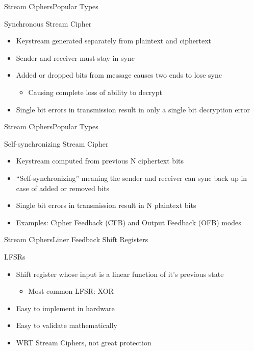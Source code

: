 \documentclass[12pt]{beamer}
\begin{document}
\begin{frame}{Stream Ciphers}{Popular Types}
\begin{block}{Synchronous Stream Cipher}
\begin{itemize}
	\item Keystream generated separately from plaintext and ciphertext
	\item Sender and receiver must stay in sync
	\item Added or dropped bits from message causes two ends to lose sync
	\begin{itemize}
		\item Causing complete loss of ability to decrypt
	\end{itemize}
	\item Single bit errors in transmission result in only a single bit decryption error
\end{itemize}
\end{block}
\end{frame}

\begin{frame}{Stream Ciphers}{Popular Types}
\begin{block}{Self-synchronizing Stream Cipher}
\begin{itemize}
	\item Keystream computed from previous N ciphertext bits
	\item ``Self-synchronizing'' meaning the sender and receiver can sync back up in case of added or removed bits
	\item Single bit errors in transmission result in N plaintext bits
	\item Examples: Cipher Feedback (CFB) and Output Feedback (OFB) modes
\end{itemize}
\end{block}
\end{frame}

\begin{frame}{Stream Ciphers}{Liner Feedback Shift Registers}
\begin{block}{LFSRs}
\begin{itemize}
	\item Shift register whose input is a linear function of it's previous state
	\begin{itemize}
		\item Most common LFSR: XOR
	\end{itemize}
	\item Easy to implement in hardware
	\item Easy to validate mathematically
	\item WRT Stream Ciphers, not great protection
\end{itemize}
\end{block}
\end{frame}
\end{document}
